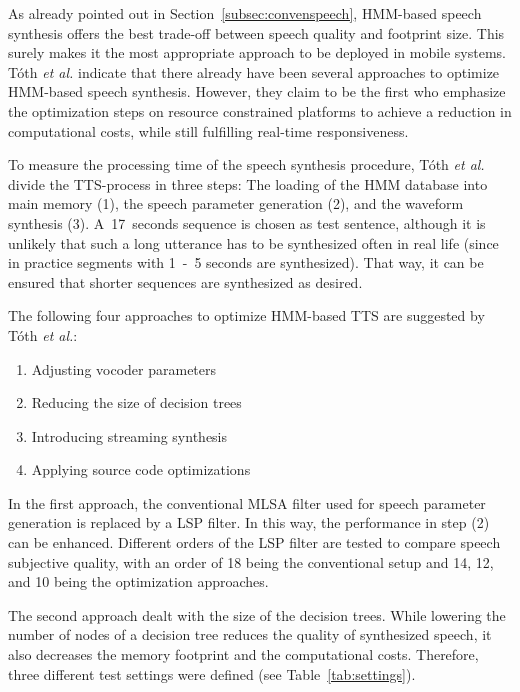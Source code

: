 As already pointed out in Section~\ref{subsec:convenspeech}, \ac{HMM}-based speech synthesis offers the best trade-off between speech quality and footprint size. This surely makes it the most appropriate approach to be deployed in mobile systems. T\'oth \textit{et al.} indicate that there already have been several approaches to optimize \ac{HMM}-based speech synthesis. However, they claim to be the first who emphasize the optimization steps on resource constrained platforms to achieve a reduction in computational costs, while still fulfilling real-time responsiveness.

To measure the processing time of the speech synthesis procedure, T\'oth \textit{et al.} divide the \ac{TTS}-process in three steps: The loading of the \ac{HMM} database
into main memory (1), the speech parameter generation (2), and the waveform synthesis (3). A~17~seconds sequence is chosen as test sentence, although it is unlikely that such a long utterance has to be synthesized often in real life (since in practice segments with 1~-~5 seconds are synthesized). That way, it can be ensured that shorter sequences are synthesized as desired.

The following four approaches to optimize \ac{HMM}-based \ac{TTS} are suggested by T\'oth \textit{et al.}:

\begin{enumerate}[label=\Alph*)]		%
	\parskip0.25em
	\bfseries
	\item Adjusting vocoder parameters
	\item Reducing the size of decision trees
	\item Introducing streaming synthesis
	\item Applying source code optimizations
\end{enumerate}

In the first approach, the conventional \ac{MLSA} filter used for speech parameter generation is replaced by a \ac{LSP} filter. In this way, the performance in step (2) can be enhanced. Different orders of the \ac{LSP} filter are tested to compare speech subjective quality, with an order of 18 being the conventional setup and 14, 12, and 10 being the optimization approaches.

The second approach dealt with the size of the decision trees. While lowering the number of nodes of a decision tree reduces the quality of synthesized speech, it also decreases the memory footprint and the computational costs. Therefore, three different test settings were defined (see Table~\ref{tab:settings}).

